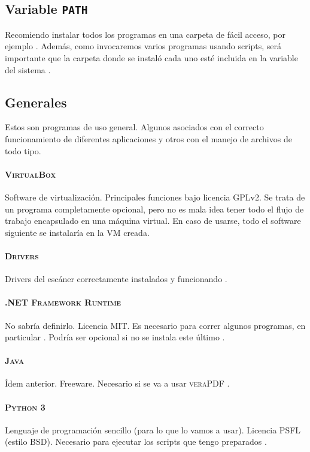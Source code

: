 \documentclass[%
	a5paper,
	10pt,
	twoside,
	openright,
	final,
]{memoir}
\begin{document}
{	\subsection{Variable \texttt{PATH}} Recomiendo instalar todos los programas en una carpeta de fácil acceso, por ejemplo . Además, como invocaremos varios programas usando scripts, será importante que la carpeta donde se instaló cada uno esté incluida en la variable  del sistema \cite{WikipediaVariableDeEntorno, SuperUserEnvironment}.

	\subsection{Generales} Estos son programas de uso general. Algunos asociados con el correcto funcionamiento de diferentes aplicaciones y otros con el manejo de archivos de todo tipo.
	\paragraph{\textsc{VirtualBox}} Software de virtualización. Principales funciones bajo licencia GPLv2. Se trata de un programa completamente opcional, pero no es mala idea tener todo el flujo de trabajo encapsulado en una máquina virtual. En caso de usarse, todo el software siguiente se instalaría en la VM creada.
	\paragraph{\textsc{Drivers}} Drivers del escáner correctamente instalados y funcionando \cite{VirtualBox}.
	\paragraph{\textsc{.NET Framework Runtime}} No sabría definirlo. Licencia MIT. Es necesario para correr algunos programas, en particular \dexpress. Podría ser opcional si no se instala este último \cite{dotNET}.
	\paragraph{\textsc{Java}} Ídem anterior. Freeware. Necesario si se va a usar \textsc{veraPDF} \cite{Java}.
	\paragraph{\textsc{Python 3}} Lenguaje de programación sencillo (para lo que lo vamos a usar). Licencia PSFL (estilo BSD). Necesario para ejecutar los scripts que tengo preparados \cite{Python3}.
}
\end{document}
